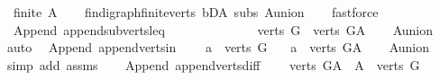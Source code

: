 \begin{isabellebody}
\ \ {\isachardoublequoteopen}finite\ A{\isachardoublequoteclose}\isanewline
%
\isadelimproof
\ \ %
\endisadelimproof
%
\isatagproof
{}\isamarkupfalse%
\ fin{\isacharunderscore}{\kern0pt}digraph{\isachardot}{\kern0pt}finite{\isacharunderscore}{\kern0pt}verts\ bD{\isacharunderscore}{\kern0pt}A\ subs{\isacharparenleft}{\kern0pt}{}{\isacharparenright}{\kern0pt}\ A{\isacharunderscore}{\kern0pt}union\isanewline
\ \ \isamarkupfalse%
\ fastforce%
\endisatagproof
{\isafoldproof}%
%
\isadelimproof
\isanewline
%
\endisadelimproof
\isanewline
\isanewline
{}\isamarkupfalse%
\ {\isacharparenleft}{\kern0pt}\ Append{\isacharparenright}{\kern0pt}\ append{\isacharunderscore}{\kern0pt}subverts{\isacharunderscore}{\kern0pt}leq{\isacharcolon}{\kern0pt}\ \ \ \ \ \ \ \ \ \ \ \ \isanewline
\ \ {\isachardoublequoteopen}verts\ G\ {\isasymsubseteq}\ verts\ G{\isacharunderscore}{\kern0pt}A{\isachardoublequoteclose}\isanewline
%
\isadelimproof
\ \ %
\endisadelimproof
%
\isatagproof
{}\isamarkupfalse%
\ A{\isacharunderscore}{\kern0pt}union\ \isamarkupfalse%
\ auto%
\endisatagproof
{\isafoldproof}%
%
\isadelimproof
\isanewline
%
\endisadelimproof
\isanewline
{}\isamarkupfalse%
\ {\isacharparenleft}{\kern0pt}\ Append{\isacharparenright}{\kern0pt}\ append{\isacharunderscore}{\kern0pt}verts{\isacharunderscore}{\kern0pt}in{\isacharcolon}{\kern0pt}\ \isanewline
\ \ \ {\isachardoublequoteopen}a\ {\isasymin}\ verts\ G{\isachardoublequoteclose}\isanewline
\ \ \ {\isachardoublequoteopen}a\ {\isasymin}\ verts\ G{\isacharunderscore}{\kern0pt}A{\isachardoublequoteclose}\isanewline
%
\isadelimproof
\ \ %
\endisadelimproof
%
\isatagproof
{}\isamarkupfalse%
\ A{\isacharunderscore}{\kern0pt}union\isanewline
\ \ \isamarkupfalse%
\ {\isacharparenleft}{\kern0pt}simp\ add{\isacharcolon}{\kern0pt}\ assms{\isacharparenright}{\kern0pt}%
\endisatagproof
{\isafoldproof}%
%
\isadelimproof
\ \isanewline
%
\endisadelimproof
\isanewline
{}\isamarkupfalse%
\ {\isacharparenleft}{\kern0pt}\ Append{\isacharparenright}{\kern0pt}\ append{\isacharunderscore}{\kern0pt}verts{\isacharunderscore}{\kern0pt}diff{\isacharcolon}{\kern0pt}\ \isanewline
\ \ \ {\isachardoublequoteopen}verts\ G{\isacharunderscore}{\kern0pt}A\ {\isacharminus}{\kern0pt}\ A\ {\isacharequal}{\kern0pt}\ verts\ G{\isachardoublequoteclose}\isanewline
%
\isadelimproof
\ \ %
\endisadelimproof
%
\isatagproof

\end{isabellebody}
